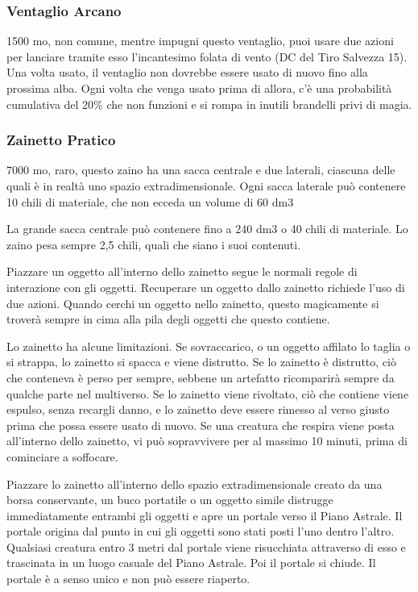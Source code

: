 \begin{multicols}{2}
	\subsubsection*{Ventaglio Arcano}
	1500 mo, non comune, mentre impugni questo ventaglio, puoi usare due azioni per lanciare tramite esso l'incantesimo folata di vento (DC del Tiro Salvezza 15). Una volta usato, il ventaglio
	non dovrebbe essere usato di nuovo fino alla prossima alba. Ogni volta che venga usato prima di allora, c'è una probabilità cumulativa del 20\% che non funzioni e si rompa in inutili brandelli privi di magia.


	\subsubsection*{Zainetto Pratico}
	7000 mo, raro, questo zaino ha una sacca centrale e due laterali, ciascuna delle quali è in realtà uno spazio extradimensionale. Ogni sacca laterale può contenere 10 chili di materiale, che non ecceda un volume di 60 dm3

	La grande sacca centrale può contenere fino a 240 dm3 o 40 chili di materiale. Lo zaino pesa sempre 2,5 chili, quali che siano i suoi contenuti.

	Piazzare un oggetto all'interno dello zainetto segue le normali regole di interazione con gli oggetti. Recuperare un oggetto dallo zainetto richiede l'uso di due azioni. Quando cerchi un oggetto nello zainetto, questo magicamente si troverà sempre in cima alla pila degli oggetti che questo contiene.

	Lo zainetto ha alcune limitazioni. Se sovraccarico, o un oggetto affilato lo taglia o si strappa, lo zainetto si spacca e viene distrutto. Se lo zainetto è distrutto, ciò che conteneva è perso per sempre, sebbene un artefatto ricomparirà sempre da qualche parte nel multiverso. Se lo zainetto viene rivoltato, ciò che contiene viene espulso, senza recargli danno, e lo zainetto deve essere rimesso al verso giusto prima che possa essere usato di nuovo. Se una creatura che respira viene posta all'interno dello zainetto, vi può sopravvivere per al massimo 10 minuti, prima di cominciare a soffocare.

	Piazzare lo zainetto all'interno dello spazio extradimensionale creato da una borsa conservante, un buco portatile o un oggetto simile distrugge immediatamente entrambi gli oggetti e apre un portale verso il Piano Astrale. Il portale origina dal punto in cui gli oggetti sono stati posti l'uno dentro l'altro. Qualsiasi creatura entro 3 metri dal portale viene risucchiata attraverso di esso e trascinata in un luogo casuale del Piano Astrale. Poi il portale si chiude. Il portale è a senso unico e non può essere riaperto.


\end{multicols}
